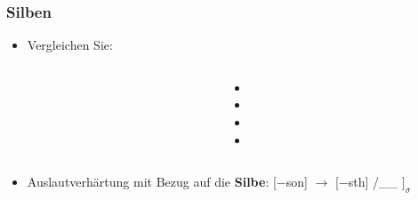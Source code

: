 \begin{frame}
\frametitle{Silben}

\begin{itemize}
	\item Vergleichen Sie:
\end{itemize}

\begin{columns}
\begin{column}[t]{.5\textwidth}
\eal 
	\ex {} \vs {}
	\ex {} \vs {} 
	\ex {} \vs {}
	\ex {} \vs {}
\zl	
\end{column}

\pause 

\begin{column}[t]{.5\textwidth}
\begin{itemize}
	\item[]  \vs {}
	\item[]  \vs {}
	\item[] \textipa{[bi:\alertred{k}.za:m]} \vs \textipa{[bi:.\alertred{g}@n]}
	\item[] \textipa{[le:\alertred{s}.b5]} \vs \textipa{[le:.\alertred{z}@n]}
\end{itemize}
\end{column}

\end{columns}	

\pause

\begin{itemize}
	\item Auslautverhärtung mit Bezug auf die \textbf{Silbe}:
	\ea
	{}[$-$son] $\rightarrow$ [$-$sth] /\_\_ $]_{\sigma}$
	\z	
\end{itemize}

\end{frame}


